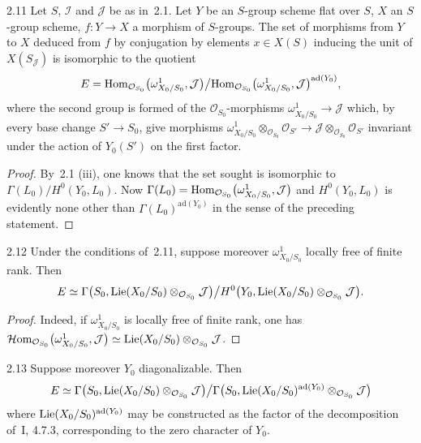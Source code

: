 \begin{corollary}{2.11}\label{III.2.11}
Let \(S\), \(\mathcal{I}\) and \(\mathcal{J}\) be as in~2.1. Let \(Y\) be an
\(S\)-group scheme flat over \(S\), \(X\) an \(S\)-group scheme,
\(f\colon Y\to X\) a morphism of \(S\)-groups. The set of morphisms from \(Y\)
to \(X\) deduced from \(f\) by conjugation by elements \(x\in X(S)\) inducing
the unit of \(X(S_{\mathcal{J}})\) is isomorphic to the quotient
\[
E=\operatorname{Hom}_{\mathcal{O}_{S_{0}}}\bigl(\omega^{1}_{X_{0}/S_{0}},\mathcal{J}\bigr)
  \big/
  {\operatorname{Hom}_{\mathcal{O}_{S_{0}}}\bigl(\omega^{1}_{X_{0}/S_{0}},\mathcal{J}\bigr)}
    ^{\mathrm{ad}(Y_{0})},
\]
where the second group is formed of the \(\mathcal{O}_{S_{0}}\)-morphisms
\(\omega^{1}_{X_{0}/S_{0}}\to\mathcal{J}\) which, by every base change
\(S'\to S_{0}\), give morphisms
\(\omega^{1}_{X_{0}/S_{0}}\otimes_{\mathcal{O}_{S_{0}}}\mathcal{O}_{S'}
\to\mathcal{J}\otimes_{\mathcal{O}_{S_{0}}}\mathcal{O}_{S'}\)
invariant under the action of \(Y_{0}(S')\) on the first factor.
\end{corollary}

\begin{proof}
\renewcommand{\qedsymbol}{}
By~2.1 (iii), one knows that the set sought is isomorphic to
\(\Gamma(L_{0})/H^{0}(Y_{0},L_{0})\). Now
\(\Gamma(L_{0})=\operatorname{Hom}_{\mathcal{O}_{S_{0}}}\bigl(\omega^{1}_{X_{0}/S_{0}},
\mathcal{J}\bigr)\) and \(H^{0}(Y_{0},L_{0})\) is evidently none other than
\(\Gamma(L_{0})^{\mathrm{ad}(Y_{0})}\) in the sense of the preceding statement.
\end{proof}

\begin{corollary}{2.12}\label{III.2.12}
Under the conditions of~2.11, suppose moreover \(\omega^{1}_{X_{0}/S_{0}}\)
locally free of finite rank. Then
\[
E\simeq\Gamma\bigl(S_{0},\operatorname{Lie}(X_{0}/S_{0})\otimes_{\mathcal{O}_{S_{0}}}
\mathcal{J}\bigr)
  \big/
  H^{0}\bigl(Y_{0},\operatorname{Lie}(X_{0}/S_{0})\otimes_{\mathcal{O}_{S_{0}}}\mathcal{J}\bigr).
\]
\end{corollary}

\begin{proof}
\renewcommand{\qedsymbol}{}
{\renewcommand{\thefootnote}{(64)}}
Indeed, if \(\omega^{1}_{X_{0}/S_{0}}\) is locally free of finite rank, one has
\(\mathcal{H}\mathrm{om}_{\mathcal{O}_{S_{0}}}\bigl(\omega^{1}_{X_{0}/S_{0}},
\mathcal{J}\bigr)
\simeq\operatorname{Lie}(X_{0}/S_{0})\otimes_{\mathcal{O}_{S_{0}}}\mathcal{J}\).
\end{proof}

\begin{corollary}{2.13}\label{III.2.13}
Suppose moreover \(Y_{0}\) diagonalizable. Then
\[
E\simeq\Gamma\bigl(S_{0},\operatorname{Lie}(X_{0}/S_{0})\otimes_{\mathcal{O}_{S_{0}}}
\mathcal{J}\bigr)
  \big/
  \Gamma\bigl(S_{0},\operatorname{Lie}(X_{0}/S_{0})^{\mathrm{ad}(Y_{0})}
    \otimes_{\mathcal{O}_{S_{0}}}\mathcal{J}\bigr)
\]
where \(\operatorname{Lie}(X_{0}/S_{0})^{\mathrm{ad}(Y_{0})}\) may be constructed as the
factor of the decomposition of~I, 4.7.3, corresponding to the zero character
of \(Y_{0}\).
\end{corollary}

